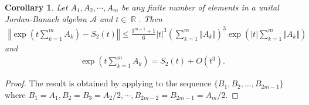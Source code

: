 \documentclass{article}
\theoremstyle{plain} %
\newtheorem{cor}[thm]{Corollary}
\numberwithin{equation}{section}
\DeclareMathOperator{\Rdb}{{\mathbb R}}
\begin{document}
\begin{cor}\label{coro:Trotter:second:JordanBanach}
Let $A_1, A_2,\cdots, A_m$ be any finite number of elements in a unital Jordan-Banach algebra $\mathcal{A}$ and $t\in \Rdb$.
Then 
\begin{align*}
\left\Vert\exp\left(t\sum_{k=1}^m A_k\right)-S_2(t)\right \Vert \leq  \frac{3^{m-1}+1}{6}\vert t\vert^3\left(\sum_{k=1}^m\Vert A_k\Vert\right)^3\exp\left(\vert t\vert\sum_{k=1}^m \Vert A_k\Vert\right)
\end{align*}
and
\begin{align*}
 \exp\left(t\sum_{k=1}^m A_k\right)=S_2(t)+O(t^3).   
\end{align*}
\end{cor}

\begin{proof}
 The result is obtained by applying  to the sequence $\displaystyle \{B_1, B_2,\dots, B_{2m-1}\}$ where $B_1=A_1, B_2=B_3=A_2/2,\cdots, B_{2m-2}=B_{2m-1}=A_m/2.$
\end{proof}
\end{document}
